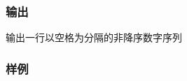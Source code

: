 \documentclass[UTF8]{ctexart}
\begin{document}
	\subsubsection{输出}
    输出一行以空格为分隔的非降序数字序列

	\subsubsection{样例}
\end{document}
